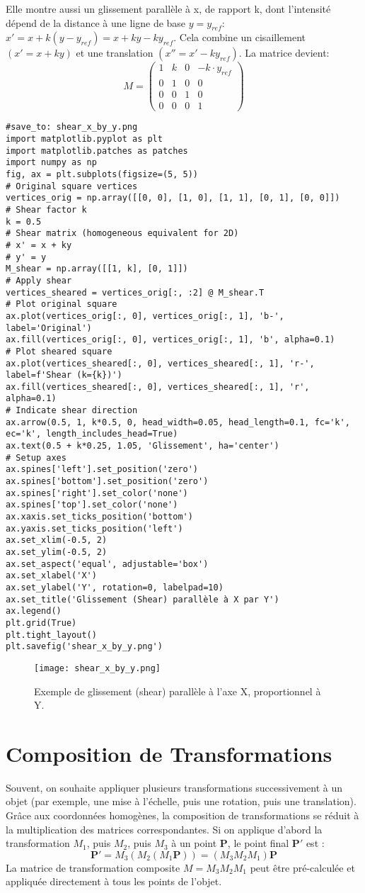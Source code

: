 Elle montre aussi un glissement parallèle à x, de rapport k, dont l'intensité dépend de la distance à une ligne de base \( y = y_{ref} \): \( x' = x + k (y - y_{ref}) = x + k y - k y_{ref} \). Cela combine un cisaillement \( (x' = x+ky) \) et une translation \( (x'' = x' - k y_{ref}) \).
La matrice devient:
\[ M = \begin{pmatrix} 1 & k & 0 & -k \cdot y_{ref} \\ 0 & 1 & 0 & 0 \\ 0 & 0 & 1 & 0 \\ 0 & 0 & 0 & 1 \end{pmatrix} \]
\begin{verbatim}
#save_to: shear_x_by_y.png
import matplotlib.pyplot as plt
import matplotlib.patches as patches
import numpy as np
fig, ax = plt.subplots(figsize=(5, 5))
# Original square vertices
vertices_orig = np.array([[0, 0], [1, 0], [1, 1], [0, 1], [0, 0]])
# Shear factor k
k = 0.5
# Shear matrix (homogeneous equivalent for 2D)
# x' = x + ky
# y' = y
M_shear = np.array([[1, k], [0, 1]])
# Apply shear
vertices_sheared = vertices_orig[:, :2] @ M_shear.T
# Plot original square
ax.plot(vertices_orig[:, 0], vertices_orig[:, 1], 'b-', label='Original')
ax.fill(vertices_orig[:, 0], vertices_orig[:, 1], 'b', alpha=0.1)
# Plot sheared square
ax.plot(vertices_sheared[:, 0], vertices_sheared[:, 1], 'r-', label=f'Shear (k={k})')
ax.fill(vertices_sheared[:, 0], vertices_sheared[:, 1], 'r', alpha=0.1)
# Indicate shear direction
ax.arrow(0.5, 1, k*0.5, 0, head_width=0.05, head_length=0.1, fc='k', ec='k', length_includes_head=True)
ax.text(0.5 + k*0.25, 1.05, 'Glissement', ha='center')
# Setup axes
ax.spines['left'].set_position('zero')
ax.spines['bottom'].set_position('zero')
ax.spines['right'].set_color('none')
ax.spines['top'].set_color('none')
ax.xaxis.set_ticks_position('bottom')
ax.yaxis.set_ticks_position('left')
ax.set_xlim(-0.5, 2)
ax.set_ylim(-0.5, 2)
ax.set_aspect('equal', adjustable='box')
ax.set_xlabel('X')
ax.set_ylabel('Y', rotation=0, labelpad=10)
ax.set_title('Glissement (Shear) parallèle à X par Y')
ax.legend()
plt.grid(True)
plt.tight_layout()
plt.savefig('shear_x_by_y.png')
\end{verbatim}
\begin{figure}[H]
\centering
\texttt{[image: shear\_x\_by\_y.png]}
\caption{Exemple de glissement (shear) parallèle à l'axe X, proportionnel à Y.}
\label{fig:shear_x_by_y}
\end{figure}
\section{Composition de Transformations}
Souvent, on souhaite appliquer plusieurs transformations successivement à un objet (par exemple, une mise à l'échelle, puis une rotation, puis une translation). Grâce aux coordonnées homogènes, la composition de transformations se réduit à la multiplication des matrices correspondantes.
Si on applique d'abord la transformation \( M_1 \), puis \( M_2 \), puis \( M_3 \) à un point \( \mathbf{P} \), le point final \( \mathbf{P'} \) est :
\[ \mathbf{P'} = M_3 ( M_2 ( M_1 \mathbf{P} ) ) = (M_3 M_2 M_1) \mathbf{P} \]
La matrice de transformation composite \( M = M_3 M_2 M_1 \) peut être pré-calculée et appliquée directement à tous les points de l'objet.
